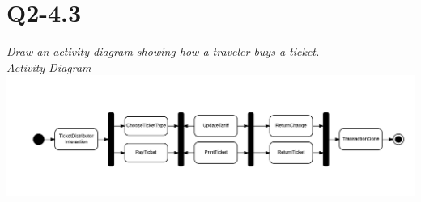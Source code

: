 \section{Q2-4.3}
\emph{Draw an activity diagram showing how a traveler buys a ticket.}
\\
\emph{Activity Diagram}
\\
\includegraphics[scale=0.2]{Activity-Diagram-TicketDistributor-State-Diagram}